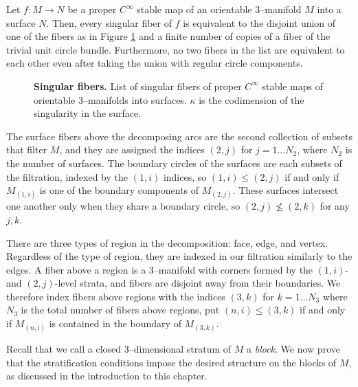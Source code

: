 \begin{theorem}
	Let $f:M\to N$ be a proper $C^\infty$ stable map of an orientable 3--manifold $M$ into a surface $N$.
	Then, every singular fiber of $f$ is equivalent to the disjoint union of one of the fibers as in Figure \ref{fig:saeki-fibers} and a finite number of copies of a fiber of the trivial unit circle bundle.
	Furthermore, no two fibers in the list are equivalent to each other even after taking the union with regular circle components.		
\end{theorem}

\begin{figure}[h!]
	\caption{
		\textbf{Singular fibers.}
		List of singular fibers of proper $C^\infty$ stable maps of orientable 3--manifolds into surfaces.
		$\kappa$ is the codimension of the singularity in the surface.
	}
	\label{fig:saeki-fibers}	
\end{figure}

The surface fibers above the decomposing arcs are the second collection of subsets that filter $M$, and they are assigned the indices $(2,j)$ for $j=1\dots N_2$, where $N_2$ is the number of surfaces.
The boundary circles of the surfaces are each subsets of the filtration, indexed by the $(1,i)$ indices, so $(1,i)\leq (2,j)$ if and only if $M_{(1,i)}$ is one of the boundary components of $M_{(2,j)}$.
These surfaces intersect one another only when they share a boundary circle, so $(2,j)\nleq (2,k)$ for any $j,k$.

There are three types of region in the decomposition: face, edge, and vertex.
Regardless of the type of region, they are indexed in our filtration similarly to the edges.
A fiber above a region is a 3--manifold with corners formed by the $(1,i)$- and $(2,j)$-level strata, and fibers are disjoint away from their boundaries.
We therefore index fibers above regions with the indices $(3,k)$ for $k=1\dots N_3$ where $N_3$ is the total number of fibers above regions, put $(n,i)\leq (3,k)$ if and only if $M_{(n,i)}$ is contained in the boundary of $M_{(3,k)}$.

Recall that we call a closed 3--dimensional stratum of $M$ a \emph{block}.
We now prove that the stratification conditions impose the desired structure on the blocks of $M$, as discussed in the introduction to this chapter.

